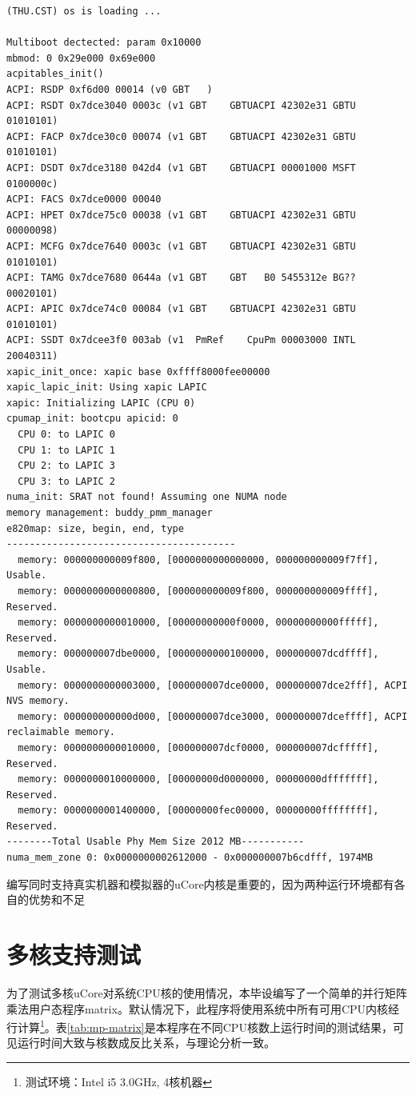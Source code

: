 {\tiny
	\begin{Verbatim}[frame=single]
(THU.CST) os is loading ...

Multiboot dectected: param 0x10000
mbmod: 0 0x29e000 0x69e000
acpitables_init()
ACPI: RSDP 0xf6d00 00014 (v0 GBT   )
ACPI: RSDT 0x7dce3040 0003c (v1 GBT    GBTUACPI 42302e31 GBTU 01010101)
ACPI: FACP 0x7dce30c0 00074 (v1 GBT    GBTUACPI 42302e31 GBTU 01010101)
ACPI: DSDT 0x7dce3180 042d4 (v1 GBT    GBTUACPI 00001000 MSFT 0100000c)
ACPI: FACS 0x7dce0000 00040
ACPI: HPET 0x7dce75c0 00038 (v1 GBT    GBTUACPI 42302e31 GBTU 00000098)
ACPI: MCFG 0x7dce7640 0003c (v1 GBT    GBTUACPI 42302e31 GBTU 01010101)
ACPI: TAMG 0x7dce7680 0644a (v1 GBT    GBT   B0 5455312e BG?? 00020101)
ACPI: APIC 0x7dce74c0 00084 (v1 GBT    GBTUACPI 42302e31 GBTU 01010101)
ACPI: SSDT 0x7dcee3f0 003ab (v1  PmRef    CpuPm 00003000 INTL 20040311)
xapic_init_once: xapic base 0xffff8000fee00000
xapic_lapic_init: Using xapic LAPIC
xapic: Initializing LAPIC (CPU 0)
cpumap_init: bootcpu apicid: 0
  CPU 0: to LAPIC 0
  CPU 1: to LAPIC 1
  CPU 2: to LAPIC 3
  CPU 3: to LAPIC 2
numa_init: SRAT not found! Assuming one NUMA node
memory management: buddy_pmm_manager
e820map: size, begin, end, type
----------------------------------------
  memory: 000000000009f800, [0000000000000000, 000000000009f7ff], Usable.
  memory: 0000000000000800, [000000000009f800, 000000000009ffff], Reserved.
  memory: 0000000000010000, [00000000000f0000, 00000000000fffff], Reserved.
  memory: 000000007dbe0000, [0000000000100000, 000000007dcdffff], Usable.
  memory: 0000000000003000, [000000007dce0000, 000000007dce2fff], ACPI NVS memory.
  memory: 000000000000d000, [000000007dce3000, 000000007dceffff], ACPI reclaimable memory.
  memory: 0000000000010000, [000000007dcf0000, 000000007dcfffff], Reserved.
  memory: 0000000010000000, [00000000d0000000, 00000000dfffffff], Reserved.
  memory: 0000000001400000, [00000000fec00000, 00000000ffffffff], Reserved.
--------Total Usable Phy Mem Size 2012 MB-----------
numa_mem_zone 0: 0x0000000002612000 - 0x000000007b6cdfff, 1974MB
	\end{Verbatim}
}

编写同时支持真实机器和模拟器的uCore内核是重要的，因为两种运行环境都有各自的优势和不足

\section{多核支持测试}
为了测试多核uCore对系统CPU核的使用情况，本毕设编写了一个简单的并行矩阵乘法用户态程序matrix。默认情况下，此程序将使用系统中所有可用CPU内核经行计算\footnote{测试环境：Intel
i5 3.0GHz, 4核机器}。表\ref{tab:mp-matrix}是本程序在不同CPU核数上运行时间的测试结果，可见运行时间大致与核数成反比关系，与理论分析一致。

